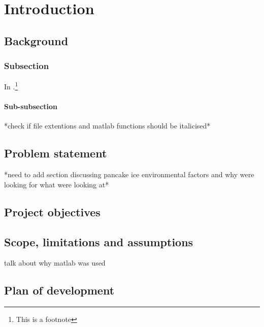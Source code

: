 \chapter{Introduction}
\label{ch:ch1.introduction}
\section{Background}
\label{sec:ch1.background}
\subsection{Subsection}
\label{subsec:ch1.section1.subsec1}
In .\footnote{This is a footnote}
\subsubsection{Sub-subsection}
\label{subsec:ch1.section1.subsubsec1}

*check if file extentions and matlab functions should be italicised*

\pagebreak



\section{Problem statement}
\label{sec:ch1.problemstatement}
*need to add section discussing pancake ice environmental factors and why were looking for what were looking at*

\section{Project objectives}
\label{sec:ch1.projectobjectives}


\section{Scope, limitations and assumptions}
\label{sec:ch1.scope}

talk about why matlab was used

\section{Plan of development}
\label{sec:ch1.planofdevelopment}


